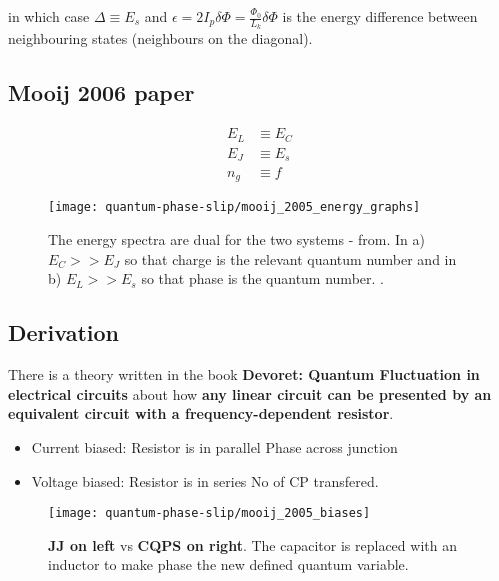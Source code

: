  \noindent      in     which      case     $\Delta      \equiv     E_s$      and
 $\epsilon =  2I_p\delta\Phi =  \frac{\Phi_{0}}{L_{k}}\delta\Phi$ is  the energy
 difference between neighbouring states (neighbours on the diagonal).



 \subsection{Mooij 2006 paper \cite{mooij2005}}
 \label{sec:mooij-2006-paper}

 \begin{equation}
   \begin{aligned}
     E_{L} & \equiv E_C\\
     E_{J} & \equiv E_s \\
     n_{g} & \equiv f
   \end{aligned}
 \end{equation}

 \noindent


\begin{figure}[h]
  \centering
  \texttt{[image: quantum-phase-slip/mooij\_2005\_energy\_graphs]}
  \caption{\small The energy spectra are dual for  the two systems - from. In a)
    $E_C  >> E_J$  so that  charge  is the  relevant  quantum number  and in  b)
    $E_L     >>      E_s$     so      that     phase     is      the     quantum
    number. \cite{mooij2005}. \label{fig:mooij_2005_energy_graphs}}
\end{figure}

\subsection{Derivation}
\label{sec:derivation}

There is  a theory written in  the book \textbf{Devoret: Quantum  Fluctuation in
  electrical circuits} about how \textbf{any  linear circuit can be presented by
  an equivalent circuit with a frequency-dependent resistor}.

\begin{itemize}
\item Current biased: Resistor is in parallel \hfill Phase across junction
\item Voltage biased: Resistor is in series \hfill No of CP transfered.
\end{itemize}

\begin{figure}[h]
  \centering \texttt{[image: quantum-phase-slip/mooij\_2005\_biases]}
  \caption{\small \textbf{JJ on left} vs  \textbf{CQPS on right}.  The capacitor
    is  replaced  with  an  inductor  to make  phase  the  new  defined  quantum
    variable. \label{fig:mooij_2005_biases}}
\end{figure}

